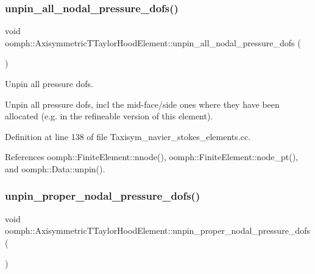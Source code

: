 \subsubsection{\texorpdfstring{unpin\+\_\+all\+\_\+nodal\+\_\+pressure\+\_\+dofs()}{unpin\_all\_nodal\_pressure\_dofs()}}
{\footnotesize\ttfamily void oomph\+::\+Axisymmetric\+T\+Taylor\+Hood\+Element\+::unpin\+\_\+all\+\_\+nodal\+\_\+pressure\+\_\+dofs (\begin{DoxyParamCaption}{ }\end{DoxyParamCaption})\hspace{0.3cm}{\ttfamily [protected]}}



Unpin all pressure dofs. 

Unpin all pressure dofs, incl the mid-\/face/side ones where they have been allocated (e.\+g. in the refineable version of this element). 

Definition at line 138 of file Taxisym\+\_\+navier\+\_\+stokes\+\_\+elements.\+cc.



References oomph\+::\+Finite\+Element\+::nnode(), oomph\+::\+Finite\+Element\+::node\+\_\+pt(), and oomph\+::\+Data\+::unpin().

\mbox{\label{classoomph_1_1AxisymmetricTTaylorHoodElement_abf71bcb109d1e5ee51b621f9287cd486}} 
\subsubsection{\texorpdfstring{unpin\+\_\+proper\+\_\+nodal\+\_\+pressure\+\_\+dofs()}{unpin\_proper\_nodal\_pressure\_dofs()}}
{\footnotesize\ttfamily void oomph\+::\+Axisymmetric\+T\+Taylor\+Hood\+Element\+::unpin\+\_\+proper\+\_\+nodal\+\_\+pressure\+\_\+dofs (\begin{DoxyParamCaption}{ }\end{DoxyParamCaption})\hspace{0.3cm}{\ttfamily [protected]}}



